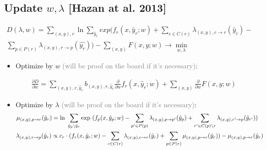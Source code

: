 \documentclass{beamer}
\begin{document}
\subsection*{Update $w, \lambda$ [Hazan at al. 2013]}
\begin{frame}
	\begin{tcolorbox}[colback=white!2, colframe=red!90]
		\begin{equation*}
			\begin{aligned}
				D(\lambda, w) = \sum_{(x, y), r} \ln{\sum_{\hat{y}_r}} exp\bigl(f_r(x, \hat{y}_r; w) + \sum_{c \in C(r)} \lambda_{(x, y), c \rightarrow r} (\hat{y}_c) -\\
				\sum_{p \in P(r)} \lambda_{(x, y), r \rightarrow p} (\hat{y_r})\bigr) - \sum_{(x, y)} F(x, y; w) \rightarrow \min_{w, \lambda}
			\end{aligned}
		\end{equation*}
	\end{tcolorbox}
	
	\setlength{\leftmargini}{0.5em}
	\begin{itemize}
	\item Optimize by $w$ \small{\textcolor{gray}{(will be proof on the board if it's necessary)}}:
	
		\begin{equation*}
			\begin{aligned}
				\frac{\partial D}{\partial w} = \sum _{(x, y), r, \hat{y}_r} b_{(x, y), r, \hat{y}_r} \frac{\partial}{\partial w} f_r(x, \hat{y}_r; w) + \sum_{(x, y)} \frac{\partial}{\partial w} F(x, y; w)
			\end{aligned}
		\end{equation*}
		
	\item Optimize by $\lambda$ \small{\textcolor{gray}{(will be proof on the board if it's necessary)}}:
	{\scriptsize
		\begin{multline*}
		\hspace{-0.3cm} \mu_{(x, y), p \rightarrow r} (\hat{y}_r) = \ln~
		\sum_{
			\hat{y}_p \setminus \hat{y}_r}
		\exp~
		(
		f_p(x, \hat{y}_p; w) - 
		\sum_{p' \in P(p)} \lambda_{(x, y),  p \rightarrow p'}(\hat{y}_p)
		+ \sum_{r' \in C(p) \setminus r} \lambda_{(x, y),  r' \rightarrow p}(\hat{y}_{r'}) 
		)
		\\
		\hspace{0cm}\lambda_{(x, y), r \rightarrow p}(\hat{y}_r) \propto 
		c_r \cdot (
		f_r(x, \hat{y}_r; w) - 
		\sum_{c \in C(r)}{\lambda_{(x, y), c \rightarrow r}(\hat{y}_c)} + 
		\sum_{p \in P(r)}{\mu_{(x, y), p \rightarrow r}(\hat{y}_r)}
		)
		- \mu_{(x, y), p \rightarrow r} (\hat{y}_r)
		\end{multline*}}
	\end{itemize}
\end{frame}
\end{document}
